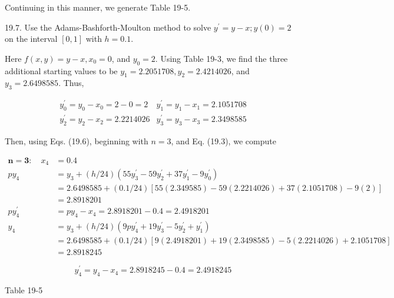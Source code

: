 \documentclass[10pt]{article}
\begin{document}
Continuing in this manner, we generate Table 19-5.

19.7. Use the Adams-Bashforth-Moulton method to solve $y^{\prime}=y-x ; y(0)=2$ on the interval $[0,1]$ with $h=0.1$.

Here $f(x, y)=y-x, x_{0}=0$, and $y_{0}=2$. Using Table 19-3, we find the three additional starting values to be $y_{1}=2.2051708, y_{2}=2.4214026$, and $y_{3}=2.6498585$. Thus,

$$
\begin{array}{ll}
y_{0}^{\prime}=y_{0}-x_{0}=2-0=2 & y_{1}^{\prime}=y_{1}-x_{1}=2.1051708 \\
y_{2}^{\prime}=y_{2}-x_{2}=2.2214026 & y_{3}^{\prime}=y_{3}-x_{3}=2.3498585
\end{array}
$$

Then, using Eqs. (19.6), beginning with $n=3$, and Eq. (19.3), we compute

$$
\begin{aligned}
\boldsymbol{n}=\mathbf{3}: \quad x_{4} & =0.4 \\
p y_{4} & =y_{3}+(h / 24)\left(55 y_{3}^{\prime}-59 y_{2}^{\prime}+37 y_{1}^{\prime}-9 y_{0}^{\prime}\right) \\
& =2.6498585+(0.1 / 24)[55(2.349585)-59(2.2214026)+37(2.1051708)-9(2)] \\
& =2.8918201 \\
p y_{4}^{\prime} & =p y_{4}-x_{4}=2.8918201-0.4=2.4918201 \\
y_{4} & =y_{3}+(h / 24)\left(9 p y_{4}^{\prime}+19 y_{3}^{\prime}-5 y_{2}^{\prime}+y_{1}^{\prime}\right) \\
& =2.6498585+(0.1 / 24)[9(2.4918201)+19(2.3498585)-5(2.2214026)+2.1051708] \\
& =2.8918245
\end{aligned}
$$

$$
y_{4}^{\prime}=y_{4}-x_{4}=2.8918245-0.4=2.4918245
$$

Table 19-5
\end{document}
